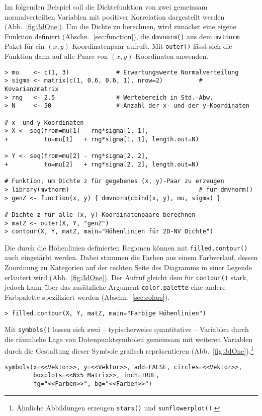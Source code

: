 Im folgenden Beispiel soll die Dichtefunktion von zwei gemeinsam normalverteilten Variablen mit positiver Korrelation dargestellt werden (Abb.\ \ref{fig:3dOne}). Um die Dichte zu berechnen, wird zunächst eine eigene Funktion definiert (Abschn.\ \ref{sec:function}), die \lstinline!dmvnorm()! aus dem \lstinline!mvtnorm! Paket für ein $(x, y)$-Koordinatenpaar aufruft. Mit \lstinline!outer()! lässt sich die Funktion dann auf alle Paare von $(x, y)$-Koordinaten anwenden.
\begin{lstlisting}
> mu    <- c(1, 3)             # Erwartungswerte Normalverteilung
> sigma <- matrix(c(1, 0.6, 0.6, 1), nrow=2)          # Kovarianzmatrix
> rng   <- 2.5                 # Wertebereich in Std.-Abw.
> N     <- 50                  # Anzahl der x- und der y-Koordinaten

# x- und y-Koordinaten
> X <- seq(from=mu[1] - rng*sigma[1, 1],
+          to=mu[1]   + rng*sigma[1, 1], length.out=N)

> Y <- seq(from=mu[2] - rng*sigma[2, 2],
+          to=mu[2]   + rng*sigma[2, 2], length.out=N)

# Funktion, um Dichte z für gegebenes (x, y)-Paar zu erzeugen
> library(mvtnorm)                                    # für dmvnorm()
> genZ <- function(x, y) { dmvnorm(cbind(x, y), mu, sigma) }

# Dichte z für alle (x, y)-Koordinatenpaare berechnen
> matZ <- outer(X, Y, "genZ")
> contour(X, Y, matZ, main="Höhenlinien für 2D-NV Dichte")
\end{lstlisting}

Die durch die Höhenlinien definierten Regionen können mit \lstinline!filled.contour()! auch eingefärbt werden. Dabei stammen die Farben aus einem Farbverlauf, dessen Zuordnung zu Kategorien auf der rechten Seite des Diagramms in einer Legende erläutert wird (Abb.\ \ref{fig:3dOne}). Der Aufruf gleicht dem für \lstinline!contour()! stark, jedoch kann über das zusätzliche Argument \lstinline!color.palette! eine andere Farbpalette spezifiziert werden (Abschn.\ \ref{sec:colors}).
\begin{lstlisting}
> filled.contour(X, Y, matZ, main="Farbige Höhenlinien")
\end{lstlisting}

Mit \lstinline!symbols()! lassen sich zwei -- typischerweise quantitative -- Variablen durch die räumliche Lage von Datenpunktsymbolen gemeinsam mit weiteren Variablen durch die Gestaltung dieser Symbole grafisch repräsentieren (Abb.\ \ref{fig:3dOne}).\footnote{Ähnliche Abbildungen erzeugen \lstinline!stars()! und \lstinline!sunflowerplot()!.}
\begin{lstlisting}
symbols(x=<<Vektor>>, y=<<Vektor>>, add=FALSE, circles=<<Vektor>>,
        boxplots=<<Nx5 Matrix>>, inch=TRUE,
        fg="<<Farben>>", bg="<<Farben>>")

\end{lstlisting}

